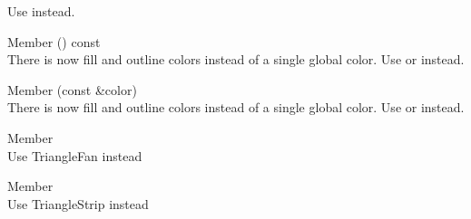 \begin{DoxyRefList}
\label{deprecated__deprecated000020}%
%
Use  instead. 
\item[Member \doxylink{classsf_1_1_text_ab367e86c9e9e6cd3806c362ab8e79101}{sf\+::Text\+::get\+Color} () const]\hfill \\
\label{deprecated__deprecated000022}%
%
There is now fill and outline colors instead of a single global color. Use  or  instead. 
\item[Member \doxylink{classsf_1_1_text_afd1742fca1adb6b0ea98357250ffb634}{sf\+::Text\+::set\+Color} (const \doxylink{classsf_1_1_color}{Color} \&color)]\hfill \\
\label{deprecated__deprecated000021}%
%
There is now fill and outline colors instead of a single global color. Use  or  instead. 
\item[Member \doxylink{group__graphics_gga5ee56ac1339984909610713096283b1ba5338a2c6d922151fe50f235036af8a20}{sf\+::Triangles\+Fan} ]\hfill \\
\label{deprecated__deprecated000008}%
%
Use Triangle\+Fan instead  
\item[Member \doxylink{group__graphics_gga5ee56ac1339984909610713096283b1ba66643dbbb24bbacb405973ed80eebae0}{sf\+::Triangles\+Strip} ]\hfill \\
\label{deprecated__deprecated000007}%
%
Use Triangle\+Strip instead 
\end{DoxyRefList}